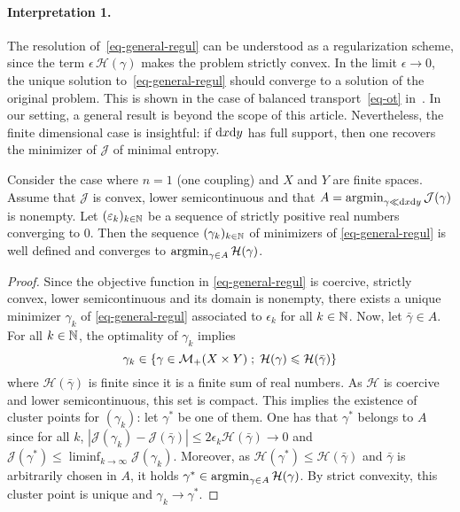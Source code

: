 \paragraph{Interpretation 1.}
The resolution of~\eqref{eq-general-regul} can be understood as a regularization scheme, since the term $\epsilon\, \mathcal{H}(\gamma)$ makes the problem strictly convex. In the limit $\epsilon \rightarrow 0$, the unique solution to~\eqref{eq-general-regul} should converge to a solution of the original problem. This is shown in the case of balanced transport~\eqref{eq-ot} in~\cite{2015-carlier-convergence,leonard2012schrodinger}. 
In our setting, a general result is beyond the scope of this article. Nevertheless, the finite dimensional case is insightful: if $\mathrm{d} x \mathrm{d} y$ has full support, then one recovers the minimizer of $\mathcal{J}$ of minimal entropy.
%
\begin{proposition}
\label{prop_converg_regul}
Consider the case where $n=1$ (one coupling) and $X$ and $Y$ are finite spaces. Assume that $\mathcal{J}$ is convex, lower semicontinuous and that $A = \operatorname*{argmin}_{\gamma \ll \mathrm{d} x \mathrm{d} y} \mathcal{J}(\gamma)$ is nonempty. Let $(\varepsilon_k)_{k\in \mathbb{N}}$ be a sequence of strictly positive real numbers converging to $0$. Then the sequence $(\gamma_k)_{k\in \mathbb{N}}$ of minimizers of \eqref{eq-general-regul} is well defined and converges to $\operatorname*{argmin}_{\gamma \in A} \mathcal{H}(\gamma)$.
\end{proposition}
%
\begin{proof}
Since the objective function in \eqref{eq-general-regul} is coercive, strictly convex, lower semicontinuous and its domain is nonempty, there exists a unique minimizer $\gamma_k$ of \eqref{eq-general-regul} associated to $\epsilon_k$ for all $k \in \mathbb{N}$. Now, let $\bar{\gamma}\in A$. For all $k\in \mathbb{N}$, the optimality of $\gamma_k$ implies
\[
\gamma_k \in \left\{  \gamma \in \mathcal{M}_+(X \times Y) \;;\; \mathcal{H}(\gamma) \leqslant \mathcal{H}(\bar{\gamma})  \right\}
\]
where $\mathcal{H}(\bar{\gamma})$ is finite since it is a finite sum of real numbers. As $\mathcal{H}$ is coercive and lower semicontinuous, this set is compact. This implies the existence of cluster points for $(\gamma_k)$: let $\gamma^*$ be one of them. 
%
One has that $\gamma^*$ belongs to $A$ since  for all $k$, $|\mathcal{J}(\gamma_k)-\mathcal{J}(\bar{\gamma})|\leq 2\epsilon_k \mathcal{H}(\bar{\gamma}) \to 0$ and $\mathcal{J}(\gamma^*) \leq \liminf_{k \to \infty} \mathcal{J}(\gamma_k)$. 
%
Moreover, as $\mathcal{H}(\gamma^*) \leq \mathcal{H}(\bar{\gamma})$ and $\bar{\gamma}$ is arbitrarily chosen in $A$, it holds $\gamma^* \in \operatorname*{argmin}_{\gamma \in A} \mathcal{H}(\gamma)$. 
%
By strict convexity, this cluster point is unique and $\gamma_k \to \gamma^*$.
\end{proof}
%

